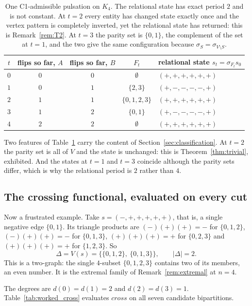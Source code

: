 \documentclass[11pt,a4paper]{article}
\def\mathrm#1{#1}%
\def\mathcal#1{#1}%
\newcommand{\Kfour}{K_4}
\newcommand{\cross}{\mathrm{cross}}
\newcommand{\dtg}{d}
\begin{document}
\begin{table}[h]
\centering
\small
\begin{tabular}{ccccl}
\toprule
$t$ & flips so far, $A$ & flips so far, $B$ & $F_t$ & relational state $s_t=\sigma_{F_t}s_0$ \\
\midrule
$0$ & $0$ & $0$ & $\emptyset$ & $(+,+,+,+,+,+)$ \\
$1$ & $0$ & $1$ & $\{2,3\}$   & $(+,-,-,-,-,+)$ \\
$2$ & $1$ & $1$ & $\{0,1,2,3\}$ & $(+,+,+,+,+,+)$ \\
$3$ & $1$ & $2$ & $\{0,1\}$   & $(+,-,-,-,-,+)$ \\
$4$ & $2$ & $2$ & $\emptyset$ & $(+,+,+,+,+,+)$ \\
\bottomrule
\end{tabular}
\caption{One C1-admissible pulsation on $\Kfour$. The relational state has exact period $2$ and is not constant. At $t=2$ every entity has changed state exactly once and the vertex pattern is completely inverted, yet the relational state has returned: this is Remark~\ref{rem:T2}. At $t=3$ the parity set is $\{0,1\}$, the complement of the set at $t=1$, and the two give the same configuration because $\sigma_S=\sigma_{V\setminus S}$.}
\label{tab:worked_pulse}
\end{table}

Two features of Table~\ref{tab:worked_pulse} carry the content of Section~\ref{sec:classification}. At $t=2$ the parity set is all of $V$ and the state is unchanged: this is Theorem~\ref{thm:trivial}, exhibited. And the states at $t=1$ and $t=3$ coincide although the parity sets differ, which is why the relational period is $2$ rather than $4$.

\subsection{The crossing functional, evaluated on every cut}
\label{subsec:worked_cross}

Now a frustrated example. Take $s=(-,+,+,+,+,+)$, that is, a single negative edge $\{0,1\}$. Its triangle products are $(-)(+)(+)=-$ for $\{0,1,2\}$, $(-)(+)(+)=-$ for $\{0,1,3\}$, $(+)(+)(+)=+$ for $\{0,2,3\}$ and $(+)(+)(+)=+$ for $\{1,2,3\}$. So
\[
\Delta=\mathcal{V}(s)=\bigl\{\{0,1,2\},\ \{0,1,3\}\bigr\},\qquad |\Delta|=2 .
\]
This is a two-graph: the single $4$-subset $\{0,1,2,3\}$ contains two of its members, an even number. It is the extremal family of Remark~\ref{rem:extremal} at $n=4$.

The degrees are $\dtg(0)=\dtg(1)=2$ and $\dtg(2)=\dtg(3)=1$. Table~\ref{tab:worked_cross} evaluates $\cross$ on all seven candidate bipartitions.
\end{document}
